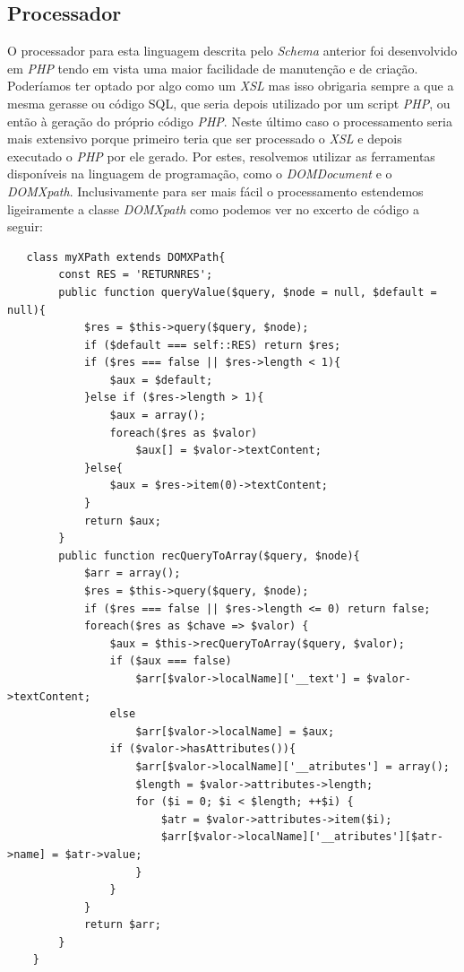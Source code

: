 \documentclass[a4paper,11pt,openright,openbib]{article}
\begin{document}
\subsection{Processador}
O processador para esta linguagem descrita pelo \emph{Schema} anterior foi desenvolvido em \emph{PHP} tendo em vista uma maior facilidade de manutenção e de criação. Poderíamos ter optado por algo como um \emph{XSL} mas isso obrigaria sempre a que a mesma gerasse ou código SQL, que seria depois utilizado por um script \emph{PHP}, ou então à geração do próprio código \emph{PHP}. Neste último caso o processamento seria mais extensivo porque primeiro teria que ser processado o \emph{XSL} e depois executado o \emph{PHP} por ele gerado. Por estes, resolvemos utilizar as ferramentas disponíveis na linguagem de programação, como o \emph{DOMDocument} e o \emph{DOMXpath}. Inclusivamente para ser mais fácil o processamento estendemos ligeiramente a classe \emph{DOMXpath} como podemos ver no excerto de código a seguir:
\begin{verbatim}
   class myXPath extends DOMXPath{
        const RES = 'RETURNRES';
        public function queryValue($query, $node = null, $default = null){
            $res = $this->query($query, $node);
            if ($default === self::RES) return $res;
            if ($res === false || $res->length < 1){
                $aux = $default;
            }else if ($res->length > 1){
                $aux = array();
                foreach($res as $valor)
                    $aux[] = $valor->textContent;
            }else{
                $aux = $res->item(0)->textContent;
            }
            return $aux;
        }
        public function recQueryToArray($query, $node){
            $arr = array();
            $res = $this->query($query, $node);
            if ($res === false || $res->length <= 0) return false;
            foreach($res as $chave => $valor) {
                $aux = $this->recQueryToArray($query, $valor);
                if ($aux === false)
                    $arr[$valor->localName]['__text'] = $valor->textContent;
                else 
                    $arr[$valor->localName] = $aux;
                if ($valor->hasAttributes()){
                    $arr[$valor->localName]['__atributes'] = array();
                    $length = $valor->attributes->length;
                    for ($i = 0; $i < $length; ++$i) {
                        $atr = $valor->attributes->item($i);
                        $arr[$valor->localName]['__atributes'][$atr->name] = $atr->value;  
                    }
                }
            }
            return $arr;
        }
    }
\end{verbatim}
\end{document}
